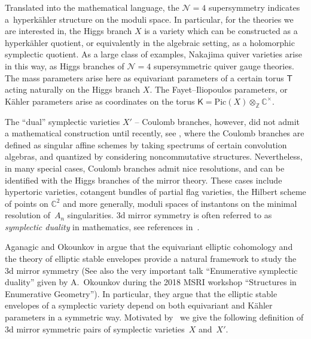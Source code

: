 \documentclass[pdftex]{sigma}
\newcommand{\bK}{\mathsf{K}}
\def\Z{{\mathbb Z}}
\def\C{{\mathbb C}}
\newcommand{\bT}{\mathsf{T}}
\numberwithin{equation}{section}
\begin{document}
Translated into the mathematical language, the $\mathcal{N} = 4$ supersymmetry indicates a~hyperk\"ahler structure on the moduli space. In particular, for the theories we are interested in, the Higgs branch $X$ is a variety which can be constructed as a hyperk\"ahler quotient, or equivalently in the algebraic setting, as a holomorphic symplectic quotient. As a large class of examples, Nakajima quiver varieties arise in this way, as Higgs branches of $\mathcal{N}=4$ supersymmetric quiver gauge theories. The mass parameters arise here as equivariant parameters of a certain torus $\bT$ acting naturally on the Higgs branch $X$. The Fayet--Iliopoulos parameters, or K\"ahler parameters arise as coordinates on the torus $\bK=\mathrm{Pic}(X)\otimes_{\Z} \C^{\times}$.

The ``dual'' symplectic varieties $X'$ -- Coulomb branches, however, did not admit a mathematical construction until recently,
see \cite{BFN2, NakCoulomb1, Coulomb1}, where the Coulomb branches are defined as singular affine schemes by taking spectrums of certain convolution algebras, and quantized by considering noncommutative structures. Nevertheless, in many special cases, Coulomb branches admit nice resolutions, and can be identified with the Higgs branches of the mirror theory. These cases include hypertoric varieties, cotangent bundles of partial flag varieties, the Hilbert scheme of points on $\C^2$ and more generally, moduli spaces of instantons on the minimal resolution of~$A_n$ singularities. 3d mirror symmetry is often referred to as \emph{symplectic duality} in mathematics, see references in~\cite{BLPW, matdu}.

Aganagic and Okounkov in \cite{AOelliptic} argue that the equivariant elliptic cohomology and the theory of elliptic stable envelopes provide a natural framework to study the 3d mirror symmetry (See also the very important talk ``Enumerative symplectic duality'' given by A.~Okounkov during the 2018 MSRI workshop ``Structures in Enumerative Geometry'').
In particular, they argue that the elliptic stable envelopes of a symplectic variety depend on both equivariant and K\"ahler parameters in a symmetric way. Motivated by~\cite{AOelliptic} we give the following definition of 3d mirror symmetric pairs of symplectic varieties~$X$ and~$X'$.
\end{document}
